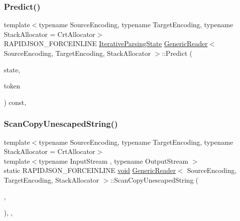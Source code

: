 \mbox{\label{classGenericReader_ad0be8224856167550255d2c9d09f4278}} 
\subsubsection{\texorpdfstring{Predict()}{Predict()}}
{\footnotesize\ttfamily template$<$typename Source\+Encoding, typename Target\+Encoding, typename Stack\+Allocator = Crt\+Allocator$>$ \\
R\+A\+P\+I\+D\+J\+S\+O\+N\+\_\+\+F\+O\+R\+C\+E\+I\+N\+L\+I\+NE \hyperlink{classGenericReader_a269700a68b925db2f3ecc84b75f2277e}{Iterative\+Parsing\+State} \hyperlink{classGenericReader}{Generic\+Reader}$<$ Source\+Encoding, Target\+Encoding, Stack\+Allocator $>$\+::Predict (\begin{DoxyParamCaption}\item[{\hyperlink{classGenericReader_a269700a68b925db2f3ecc84b75f2277e}{Iterative\+Parsing\+State}}]{state,  }\item[{\hyperlink{classGenericReader_a78cbc3012843daeaa44cb3c2b779a8a8}{Token}}]{token }\end{DoxyParamCaption}) const\hspace{0.3cm}{\ttfamily [inline]}, {\ttfamily [private]}}

\mbox{\label{classGenericReader_a22d69758dcadf454e372226be028483c}} 
\subsubsection{\texorpdfstring{Scan\+Copy\+Unescaped\+String()}{ScanCopyUnescapedString()}}
{\footnotesize\ttfamily template$<$typename Source\+Encoding, typename Target\+Encoding, typename Stack\+Allocator = Crt\+Allocator$>$ \\
template$<$typename Input\+Stream , typename Output\+Stream $>$ \\
static R\+A\+P\+I\+D\+J\+S\+O\+N\+\_\+\+F\+O\+R\+C\+E\+I\+N\+L\+I\+NE \hyperlink{imgui__impl__opengl3__loader_8h_ac668e7cffd9e2e9cfee428b9b2f34fa7}{void} \hyperlink{classGenericReader}{Generic\+Reader}$<$ Source\+Encoding, Target\+Encoding, Stack\+Allocator $>$\+::Scan\+Copy\+Unescaped\+String (\begin{DoxyParamCaption}\item[{Input\+Stream \&}]{,  }\item[{Output\+Stream \&}]{ }\end{DoxyParamCaption})\hspace{0.3cm}{\ttfamily [inline]}, {\ttfamily [static]}, {\ttfamily [private]}}

